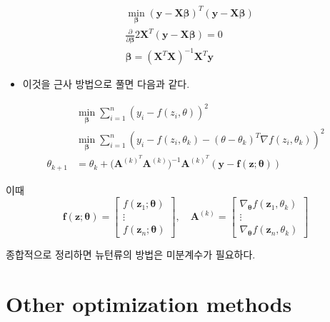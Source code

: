 \documentclass[
  letterpaper,
  DIV=11,
  numbers=noendperiod]{scrreprt}
\providecommand{\tightlist}{%
  \setlength{\itemsep}{0pt}\setlength{\parskip}{0pt}}\usepackage{longtable,booktabs,array}
\theoremstyle{definition}
\theoremstyle{definition}
\theoremstyle{remark}
\begin{document}
\begin{align*}
&\min_{\pmb{\beta}}(\pmb{y} - \pmb{X}\pmb{\beta})^T(\pmb{y} - \pmb{X}\pmb{\beta})\\
&\frac{\partial}{\partial\pmb{\beta}} 2\pmb{X}^T(\pmb{y}-\pmb{X\beta})=0\\
&\pmb{\beta} = (\pmb{X}^T\pmb{X})^{-1}\pmb{X}^T\pmb{y}
\end{align*}

\begin{itemize}
\tightlist
\item
  이것을 근사 방법으로 풀면 다음과 같다.
\end{itemize}

\begin{align*}
&\min_{\pmb{\beta}}\sum_{i=1}^n (y_i - f(z_i, \theta))^2\\
&\min_{\pmb{\beta}}\sum_{i=1}^n (y_i - f(z_i, \theta_k)- (\theta-\theta_k)^T\nabla f(z_i, \theta_k))^2\\
\theta_{k+1} &= \theta_k + \Big( \pmb{A}^{(k)^T}\pmb{A}^{(k)}  \Big)^{-1}\pmb{A}^{(k)^T}(\pmb{y}-\pmb{f}(\pmb{z};\pmb{\theta}))
\end{align*}

이때 \[
\pmb{f}(\pmb{z};\pmb{\theta}) = 
\begin{bmatrix}
f(\pmb{z}_1; \pmb{\theta})\\
\vdots\\
f(\pmb{z}_n; \pmb{\theta})
\end{bmatrix}, \quad{}
\pmb{A}^{(k)}= 
\begin{bmatrix}
\nabla_{\pmb{\theta}}f(\pmb{z}_1,\theta_k)\\
\vdots\\
\nabla_{\pmb{\theta}}f(\pmb{z}_n,\theta_k)
\end{bmatrix}
\]

종합적으로 정리하면 뉴턴류의 방법은 미분계수가 필요하다.

\section{Other optimization methods}\label{other-optimization-methods}
\end{document}
